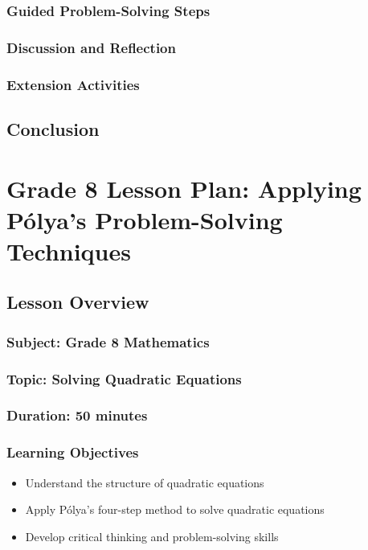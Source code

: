 \documentclass{book}
\begin{document}
\subsection{Guided Problem-Solving Steps}
\subsection{Discussion and Reflection}
\subsection{Extension Activities}


\section{Conclusion}


\chapter{Grade 8 Lesson Plan: Applying Pólya's Problem-Solving Techniques}


\section{Lesson Overview}
\subsection{Subject: Grade 8 Mathematics}
\subsection{Topic: Solving Quadratic Equations}
\subsection{Duration: 50 minutes}
\subsection{Learning Objectives}
\begin{itemize}
        \item Understand the structure of quadratic equations
        \item Apply Pólya's four-step method to solve quadratic equations
        \item Develop critical thinking and problem-solving skills
\end{itemize}
\end{document}
